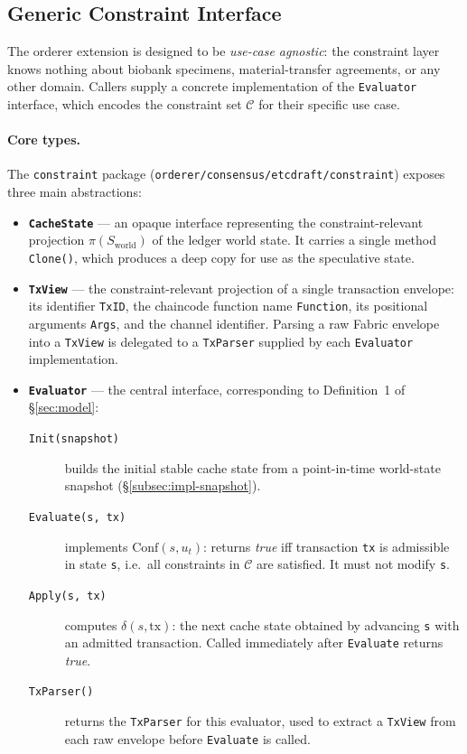 \subsection{Generic Constraint Interface}
\label{subsec:impl-interface}

The orderer extension is designed to be \emph{use-case agnostic}: the
constraint layer knows nothing about biobank specimens, material-transfer
agreements, or any other domain.  Callers supply a concrete implementation of
the \texttt{Evaluator} interface, which encodes the constraint set $\mathcal{C}$
for their specific use case.

\paragraph{Core types.}
The \texttt{constraint} package (\texttt{orderer/consensus/etcdraft/constraint})
exposes three main abstractions:

\begin{itemize}
  \item \textbf{\texttt{CacheState}} — an opaque interface representing the
    constraint-relevant projection $\pi(S_\text{world})$ of the ledger world
    state.  It carries a single method \texttt{Clone()}, which produces a
    deep copy for use as the speculative state.

  \item \textbf{\texttt{TxView}} — the constraint-relevant projection of a
    single transaction envelope: its identifier \texttt{TxID}, the chaincode
    function name \texttt{Function}, its positional arguments \texttt{Args},
    and the channel identifier.  Parsing a raw Fabric envelope into a
    \texttt{TxView} is delegated to a \texttt{TxParser} supplied by each
    \texttt{Evaluator} implementation.

  \item \textbf{\texttt{Evaluator}} — the central interface, corresponding to
    Definition~1 of \S\ref{sec:model}:
    \begin{description}
      \item[\texttt{Init(snapshot)}] builds the initial stable cache state
        from a point-in-time world-state snapshot (§\ref{subsec:impl-snapshot}).
      \item[\texttt{Evaluate(s, tx)}] implements $\mathrm{Conf}(s, u_t)$:
        returns \emph{true} iff transaction \texttt{tx} is admissible in state
        \texttt{s}, i.e.\ all constraints in $\mathcal{C}$ are satisfied.
        It must not modify \texttt{s}.
      \item[\texttt{Apply(s, tx)}] computes $\delta(s, \mathrm{tx})$: the
        next cache state obtained by advancing \texttt{s} with an admitted
        transaction.  Called immediately after \texttt{Evaluate} returns
        \emph{true}.
      \item[\texttt{TxParser()}] returns the \texttt{TxParser} for this
        evaluator, used to extract a \texttt{TxView} from each raw envelope
        before \texttt{Evaluate} is called.
    \end{description}
\end{itemize}

